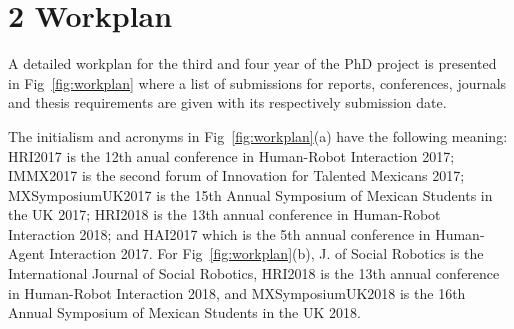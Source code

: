 \documentclass{sigchi}
\begin{document}
\section{2 Workplan}
A detailed workplan for the third and four year of the PhD project is presented
in Fig~\ref{fig:workplan} where a list of submissions for reports, conferences,
journals and thesis requirements are given with its respectively submission date.

The initialism and acronyms in Fig~\ref{fig:workplan}(a) have the following meaning:
HRI2017 is the 12th anual conference in Human-Robot Interaction 2017;
IMMX2017 is the second forum of Innovation for Talented Mexicans 2017;
MXSymposiumUK2017 is the 15th Annual Symposium of Mexican Students in the UK 2017;
HRI2018 is the 13th annual conference in Human-Robot Interaction 2018;
and HAI2017 which is the 5th annual conference in Human-Agent Interaction 2017.
For Fig~\ref{fig:workplan}(b),
J. of Social Robotics is the International Journal of Social Robotics,
HRI2018 is the 13th annual conference in Human-Robot Interaction 2018,
and
MXSymposiumUK2018 is the 16th Annual Symposium of Mexican Students in the UK 2018.
\end{document}
